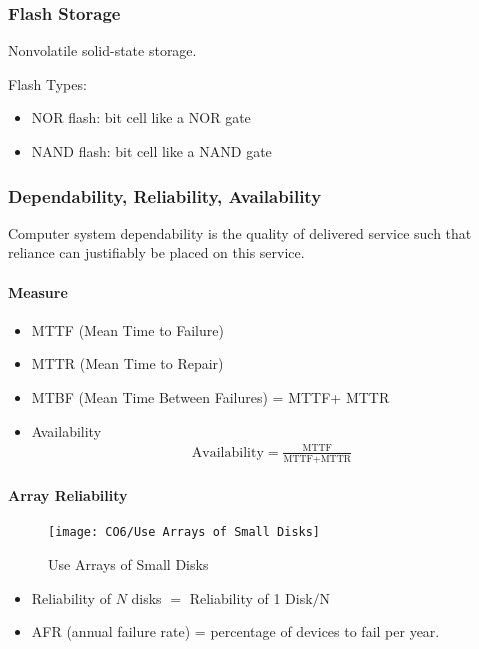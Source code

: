 \subsubsection{Flash Storage}
Nonvolatile solid-state storage.

Flash Types:
\begin{itemize}\small
    \item NOR flash: bit cell like a NOR gate
    \item NAND flash: bit cell like a NAND gate
\end{itemize}

\subsubsection{Dependability, Reliability, Availability}
Computer system dependability is the quality of delivered service such that reliance can justifiably be placed on this service.

\paragraph{Measure}
\begin{itemize}
    \item MTTF (Mean Time to Failure)
    \item MTTR (Mean Time to Repair)
    \item MTBF (Mean Time Between Failures)
    \subitem = MTTF+ MTTR
    \item Availability
    \begin{align*}
        \text{Availability}=\frac{\text{MTTF}}{\text{MTTF}+\text{MTTR}}
    \end{align*}
\end{itemize}

\paragraph{Array Reliability}
\begin{figure}[!htb]
    \centering
    \texttt{[image: CO6/Use Arrays of Small Disks]}
    \caption{Use Arrays of Small Disks}
\end{figure}
\begin{itemize}
    \item Reliability of $N$ disks $=$ Reliability of 1 Disk$/$N
    \item AFR (annual failure rate) = percentage of devices to fail per year. 
\end{itemize}

